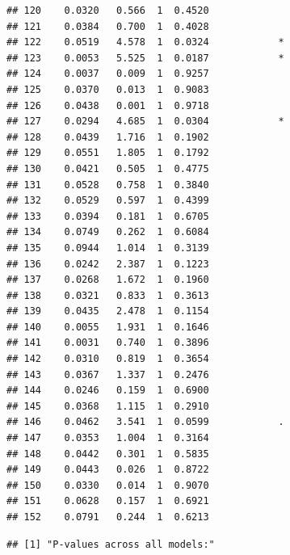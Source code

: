 \documentclass[
]{article}
\begin{document}
\begin{verbatim}
## 120    0.0320   0.566  1  0.4520             
## 121    0.0384   0.700  1  0.4028             
## 122    0.0519   4.578  1  0.0324            *
## 123    0.0053   5.525  1  0.0187            *
## 124    0.0037   0.009  1  0.9257             
## 125    0.0370   0.013  1  0.9083             
## 126    0.0438   0.001  1  0.9718             
## 127    0.0294   4.685  1  0.0304            *
## 128    0.0439   1.716  1  0.1902             
## 129    0.0551   1.805  1  0.1792             
## 130    0.0421   0.505  1  0.4775             
## 131    0.0528   0.758  1  0.3840             
## 132    0.0529   0.597  1  0.4399             
## 133    0.0394   0.181  1  0.6705             
## 134    0.0749   0.262  1  0.6084             
## 135    0.0944   1.014  1  0.3139             
## 136    0.0242   2.387  1  0.1223             
## 137    0.0268   1.672  1  0.1960             
## 138    0.0321   0.833  1  0.3613             
## 139    0.0435   2.478  1  0.1154             
## 140    0.0055   1.931  1  0.1646             
## 141    0.0031   0.740  1  0.3896             
## 142    0.0310   0.819  1  0.3654             
## 143    0.0367   1.337  1  0.2476             
## 144    0.0246   0.159  1  0.6900             
## 145    0.0368   1.115  1  0.2910             
## 146    0.0462   3.541  1  0.0599            .
## 147    0.0353   1.004  1  0.3164             
## 148    0.0442   0.301  1  0.5835             
## 149    0.0443   0.026  1  0.8722             
## 150    0.0330   0.014  1  0.9070             
## 151    0.0628   0.157  1  0.6921             
## 152    0.0791   0.244  1  0.6213
\end{verbatim}

\begin{verbatim}
## [1] "P-values across all models:"
\end{verbatim}
\end{document}
